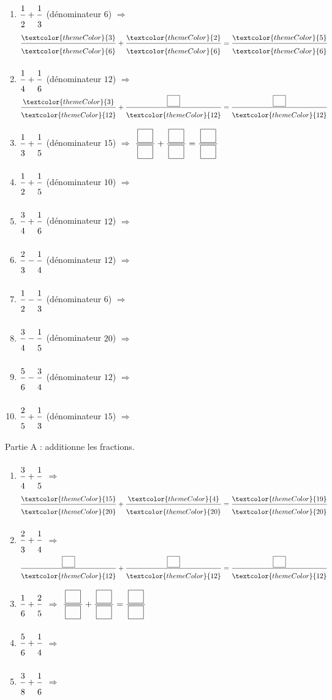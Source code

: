 \begin{enumerate}[leftmargin=*,align=parleft, label=\alph*), itemsep=9pt]
\item $\FA{1}{2}+\FA{1}{3}$ \quad (dénominateur $6$) \quad $\Longrightarrow$ \quad $\FA{\textcolor{themeColor}{3}}{\textcolor{themeColor}{6}}+\FA{\textcolor{themeColor}{2}}{\textcolor{themeColor}{6}}=\FA{\textcolor{themeColor}{5}}{\textcolor{themeColor}{6}}$
\item $\FA{1}{4}+\FA{1}{6}$ \quad (dénominateur $12$) \quad $\Longrightarrow$ \quad $\FA{\textcolor{themeColor}{3}}{\textcolor{themeColor}{12}}+\FA{\CaseC}{\textcolor{themeColor}{12}}=\FA{\CaseC}{\textcolor{themeColor}{12}}$
\item $\FA{1}{3}+\FA{1}{5}$ \quad (dénominateur $15$) \quad $\Longrightarrow$ \quad $\FA{\CaseC}{\CaseC}+\FA{\CaseC}{\CaseC}=\FA{\CaseC}{\CaseC}$
\item $\FA{1}{2}+\FA{1}{5}$ \quad (dénominateur $10$) \quad $\Longrightarrow$
\item $\FA{3}{4}+\FA{1}{6}$ \quad (dénominateur $12$) \quad $\Longrightarrow$
\item $\FA{2}{3}-\FA{1}{4}$ \quad (dénominateur $12$) \quad $\Longrightarrow$
\item $\FA{1}{2}-\FA{1}{3}$ \quad (dénominateur $6$) \quad $\Longrightarrow$
\item $\FA{3}{4}-\FA{1}{5}$ \quad (dénominateur $20$) \quad $\Longrightarrow$
\item $\FA{5}{6}-\FA{3}{4}$ \quad (dénominateur $12$) \quad $\Longrightarrow$
\item $\FA{2}{5}+\FA{1}{3}$ \quad (dénominateur $15$) \quad $\Longrightarrow$
\end{enumerate}

\newpage


\medskip
\textcolor{themeColor}{Partie A} : additionne les fractions.

\begin{enumerate}[leftmargin=*,align=parleft, label=\alph*), itemsep=9pt]
\item $\FA{3}{4}+\FA{1}{5}$ \quad $\Longrightarrow$ \quad $\FA{\textcolor{themeColor}{15}}{\textcolor{themeColor}{20}}+\FA{\textcolor{themeColor}{4}}{\textcolor{themeColor}{20}}=\FA{\textcolor{themeColor}{19}}{\textcolor{themeColor}{20}}$
\item $\FA{2}{3}+\FA{1}{4}$ \quad $\Longrightarrow$ \quad $\FA{\CaseC}{\textcolor{themeColor}{12}}+\FA{\CaseC}{\textcolor{themeColor}{12}}=\FA{\CaseC}{\textcolor{themeColor}{12}}$
\item $\FA{1}{6}+\FA{2}{5}$ \quad $\Longrightarrow$ \quad $\FA{\CaseC}{\CaseC}+\FA{\CaseC}{\CaseC}=\FA{\CaseC}{\CaseC}$
\item $\FA{5}{6}+\FA{1}{4}$ \quad $\Longrightarrow$
\item $\FA{3}{8}+\FA{1}{6}$ \quad $\Longrightarrow$
\end{enumerate}

